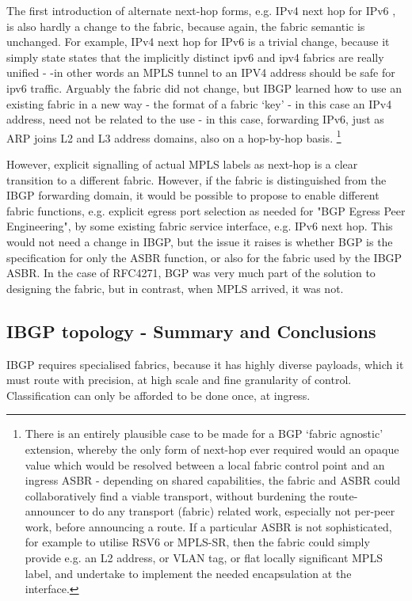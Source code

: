The first introduction of alternate next-hop forms, e.g. IPv4 next hop for IPv6 , is also hardly a change to the fabric, because again, the fabric semantic is unchanged.  For example, IPv4 next hop for IPv6 is a trivial change, because it simply state states that the implicitly distinct ipv6 and ipv4 fabrics are really unified - -in other words an MPLS tunnel to an IPV4 address should be safe for ipv6 traffic.  Arguably the fabric did not change, but IBGP learned how to use an existing fabric in a new way - the format of a fabric `key' - in this case an IPv4 address, need not be related to the use - in this case, forwarding IPv6, just as ARP joins L2 and L3 address domains, also on a hop-by-hop basis. \footnote{There is an entirely plausible case to be made for a BGP `fabric agnostic' extension, whereby the only form of next-hop ever required would an opaque value which would be resolved between a local fabric control point and an ingress ASBR - depending on shared capabilities, the fabric and ASBR could collaboratively find a viable transport, without burdening the route-announcer to do any transport (fabric) related work, especially not per-peer work, before announcing a route.   If a particular ASBR is not sophisticated, for example to utilise RSV6 or MPLS-SR, then the fabric could simply provide e.g. an L2 address, or VLAN tag, or flat locally significant MPLS label, and undertake to implement the needed encapsulation at the interface.}

\medskip

However, explicit signalling of actual MPLS labels as next-hop is a clear transition to a different fabric.  However, if the fabric is distinguished from the IBGP forwarding domain, it would be possible to propose to enable different fabric functions, e.g. explicit egress port selection as needed for "BGP Egress Peer Engineering", by some existing fabric service interface, e.g. IPv6 next hop.  This would not need a change in IBGP, but the issue it raises is whether BGP is the specification for only the ASBR function, or also for the fabric used by the IBGP ASBR.  In the case of RFC4271, BGP was very much part of the solution to designing the fabric, but in contrast, when MPLS arrived, it was not.

\subsection{IBGP topology - Summary and Conclusions}

IBGP requires specialised fabrics, because it has highly diverse payloads, which it must route with precision, at high scale and fine granularity of control.  Classification can only be afforded to be done once, at ingress.

